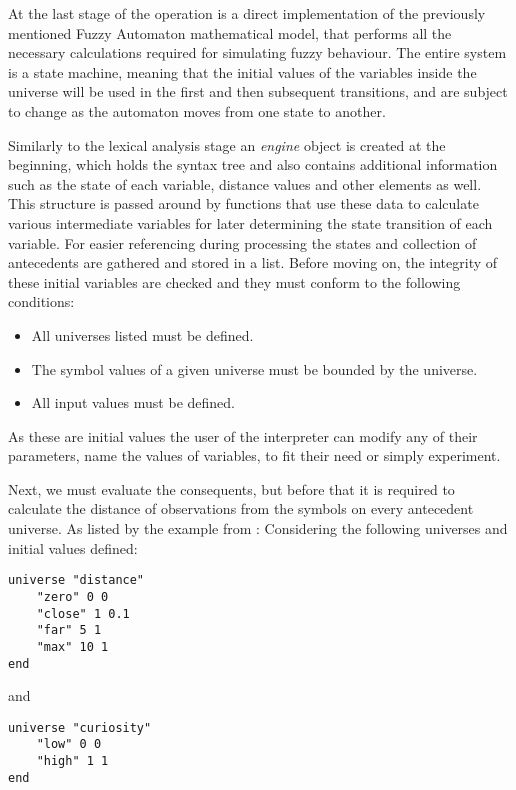 At the last stage of the operation is a direct implementation of the previously mentioned Fuzzy Automaton mathematical model, that performs all the necessary calculations required for simulating fuzzy behaviour. The entire system is a state machine, meaning that the initial values of the variables inside the universe will be used in the first and then subsequent transitions, and are subject to change as the automaton moves from one state to another.

Similarly to the lexical analysis stage an \textit{engine} object is created at the beginning, which holds the syntax tree and also contains additional information such as the state of each variable, distance values and other elements as well. This structure is passed around by functions that use these data to calculate various intermediate variables for later determining the state transition of each variable. For easier referencing during processing the states and collection of antecedents are gathered and stored in a list. Before moving on, the integrity of these initial variables are checked and they must conform to the following conditions:

\begin{itemize}
	\item All universes listed must be defined.
	\item The symbol values of a given universe must be bounded by the universe.
	\item All input values must be defined.
\end{itemize}

As these are initial values the user of the interpreter can modify any of their parameters, name the values of variables, to fit their need or simply experiment.

Next, we must evaluate the consequents, but before that it is required to calculate the distance of observations from the symbols on every antecedent universe. As listed by the example from \cite{pillerkovacs2019}:
Considering the following universes and initial values defined:

\begin{verbatim}
universe "distance"
	"zero" 0 0
	"close" 1 0.1
	"far" 5 1
	"max" 10 1
end
\end{verbatim}

and

\begin{verbatim}
universe "curiosity"
	"low" 0 0
	"high" 1 1
end
\end{verbatim}

